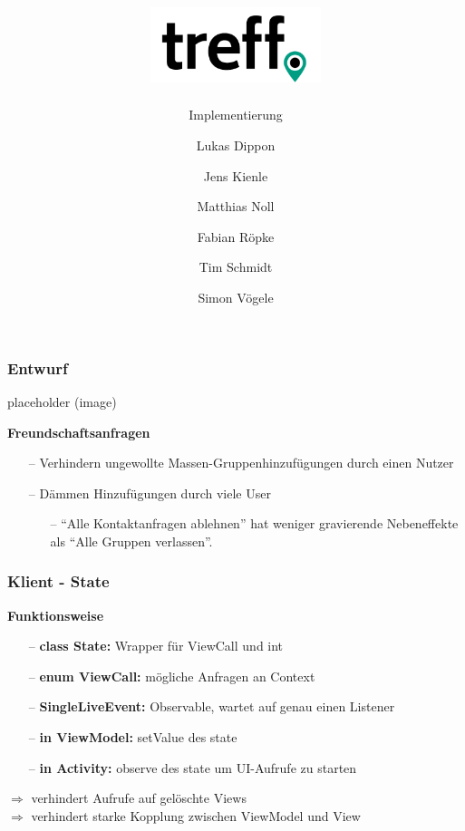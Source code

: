 \documentclass[aspectratio=1610]{beamer}
\title{\includegraphics[width = 50mm]{images/logo_crop.png}}
\subtitle{\huge Implementierung}
\author{Lukas Dippon
	\and Jens Kienle
	\and Matthias Noll
	\and Fabian Röpke
	\and Tim Schmidt
	\and Simon Vögele}
\begin{document}
	\begin{frame}[plain]
	\maketitle
	\end{frame}

	\begin{frame}[plain]
		\frametitle{Entwurf}

		\begin{minipage}{0.5\textwidth}
		placeholder (image)
		\end{minipage}%
		\begin{minipage}{0.5\textwidth}
		\textbf{Freundschaftsanfragen}
		\begin{itemize}
			\setlength\itemsep{0.3em}
            \item[--] Verhindern ungewollte Massen-Gruppenhinzufügungen durch
                einen Nutzer
            \item[--] Dämmen Hinzufügungen durch viele User
                \begin{itemize}
                    \item[--] \enquote{Alle Kontaktanfragen ablehnen} hat
                        weniger gravierende Nebeneffekte als \enquote{Alle
                        Gruppen verlassen}.
                \end{itemize}
		\end{itemize}
		\end{minipage}

	\end{frame}

	\begin{frame}[plain]
		\frametitle{Klient - State}
		\textbf{Funktionsweise}
		\begin{itemize}
			\setlength\itemsep{0.3em}
			\item[--] \textbf{class State:} Wrapper für ViewCall und int
			\item[--] \textbf{enum ViewCall:} mögliche Anfragen an Context
			\item[--] \textbf{SingleLiveEvent:} Observable, wartet auf
			genau einen Listener
			\item[--] \textbf{in ViewModel:} setValue des state
			\item[--] \textbf{in Activity:} observe des state um UI-Aufrufe
			zu starten
		\end{itemize}
	$\Rightarrow$ verhindert Aufrufe auf gelöschte Views \\
	$\Rightarrow$ verhindert starke Kopplung zwischen ViewModel und View
	\end{frame}
\end{document}
